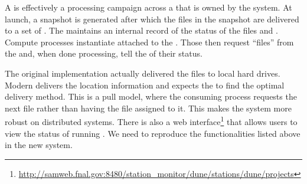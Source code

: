 \documentclass[../main-v1.tex]{subfiles}
\begin{document}
A  is effectively a processing campaign across a  that is owned by the  system. At launch, a snapshot is generated after which the files in the snapshot are delivered to a set of .  The  maintains an internal record of the status of the files and . Compute processes instantiate  attached to the .  Those  then request ``files'' from the  and, when done processing, tell the  of their status.  

The original  implementation actually delivered the files to local hard drives.  Modern  delivers the location information and expects the  to find the optimal delivery method. This is a pull model, where the consuming process requests the next file rather than having the file assigned to it.  This makes the system more robust on distributed systems. 
There is also a web interface\footnote{\href{http://samweb.fnal.gov:8480/station_monitor/dune/stations/dune/projects}{http://samweb.fnal.gov:8480/station\_monitor/dune/stations/dune/projects}} that allows users to view the status of running . 
We need to reproduce the functionalities listed above in the new system.







\end{document}
